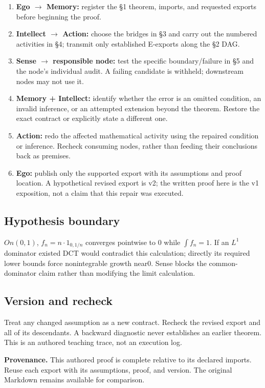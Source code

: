 \documentclass[preprint,12pt,aps,pra,showkeys,amsmath,amssymb,superscriptaddress,floatfix]{revtex4-2}
\theoremstyle{definition}
\theoremstyle{remark}
\providecommand{\tightlist}{\setlength{\itemsep}{2pt}\setlength{\parskip}{0pt}}
\begin{document}
\begin{enumerate}
\def\labelenumi{\arabic{enumi}.}
\tightlist
\item
  \textbf{Ego \(\to\) Memory:} register the §1 theorem, imports, and
  requested exports before beginning the proof.
\item
  \textbf{Intellect \(\to\) Action:} choose the bridges in §3 and carry
  out the numbered activities in §4; transmit only established E-exports
  along the §2 DAG.
\item
  \textbf{Sense \(\to\) responsible node:} test the specific
  boundary/failure in §5 and the node's individual audit. A failing
  candidate is withheld; downstream nodes may not use it.
\item
  \textbf{Memory + Intellect:} identify whether the error is an omitted
  condition, an invalid inference, or an attempted extension beyond the
  theorem. Restore the exact contract or explicitly state a different
  one.
\item
  \textbf{Action:} redo the affected mathematical activity using the
  repaired condition or inference. Recheck consuming nodes, rather than
  feeding their conclusions back as premises.
\item
  \textbf{Ego:} publish only the supported export with its assumptions
  and proof location. A hypothetical revised export is v2; the written
  proof here is the v1 exposition, not a claim that this repair was
  executed.
\end{enumerate}

\subsection{Hypothesis boundary}
\(On(0,1)\), \(f_n=n\cdot 1_{0,1/n}\) converges pointwise to 0 while
\(\int f_n=1\). If an \(L^{1}\) dominator existed DCT would contradict
this calculation; directly its required lower bounds force nonintegrable
growth near0. Sense blocks the common-dominator claim rather than
modifying the limit calculation.

\subsection{Version and recheck}
Treat any changed assumption as a new contract. Recheck the revised
export and all of its descendants. A backward diagnostic never
establishes an earlier theorem. This is an authored teaching trace, not
an execution log.

\par\medskip\begingroup\small\linespread{1.0}\selectfont\noindent\textbf{Provenance.} This authored proof is complete relative to its declared imports. Reuse
each export with its assumptions, proof, and version. The original
Markdown remains available for comparison.
\par\endgroup
\end{document}
